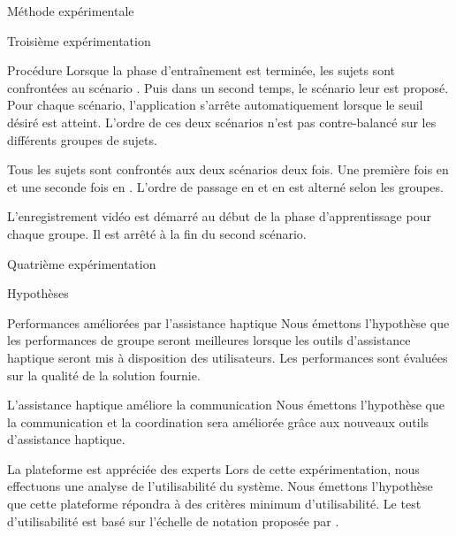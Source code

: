 \documentclass[myfrancais,ngerman,english,french]{mythesis}
\begin{document}
\begin{mychapter}{Méthode expérimentale}
\begin{mysection}{Troisième expérimentation}
\begin{mysubsection}{Procédure}
				Lorsque la phase d'entraînement est terminée, les sujets sont confrontées au scénario .
				Puis dans un second temps, le scénario  leur est proposé.
				Pour chaque scénario, l'application s'arrête automatiquement lorsque le seuil   désiré est atteint.
				L'ordre de ces deux scénarios n'est pas contre-balancé sur les différents groupes de sujets.

				Tous les sujets sont confrontés aux deux scénarios deux fois.
				Une première fois en  et une seconde fois en .
				L'ordre de passage en  et en  est alterné selon les groupes.

				L'enregistrement vidéo est démarré au début de la phase d'apprentissage pour chaque groupe.
				Il est arrêté à la fin du second scénario.
			\end{mysubsection}
		\end{mysection}
		\begin{mysection}{Quatrième expérimentation}
			\begin{mysubsection}{Hypothèses}
				\begin{myparagraph}{ Performances améliorées par l'assistance haptique}
					Nous émettons l'hypothèse que les performances de groupe seront meilleures lorsque les outils d'assistance haptique seront mis à disposition des utilisateurs.
					Les performances sont évaluées sur la qualité de la solution fournie.
				\end{myparagraph}
				\begin{myparagraph}{ L'assistance haptique améliore la communication}
					Nous émettons l'hypothèse que la communication et la coordination sera améliorée grâce aux nouveaux outils d'assistance haptique.
				\end{myparagraph}
				\begin{myparagraph}{ La plateforme est appréciée des experts}
					Lors de cette expérimentation, nous effectuons une analyse de l'utilisabilité du système.
					Nous émettons l'hypothèse que cette plateforme répondra à des critères minimum d'utilisabilité.
					Le test d'utilisabilité est basé sur l'échelle de notation  proposée par .

\end{myparagraph}
\end{mysubsection}
\end{mysection}
\end{mychapter}
\end{document}
